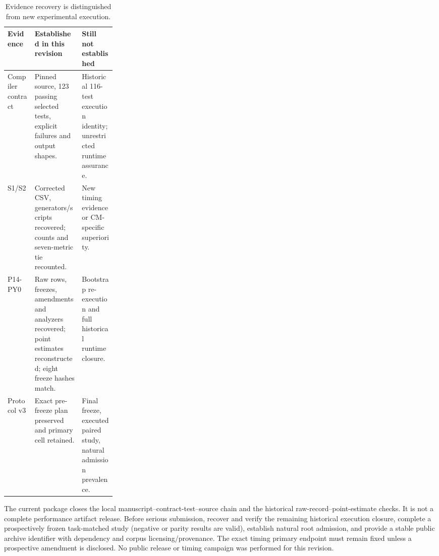 \documentclass[10pt]{article}
\theoremstyle{plain}
\theoremstyle{definition}
\theoremstyle{remark}
\begin{document}
\begin{table}[H]
\small\centering
\begin{tabularx}{\linewidth}{@{}p{0.25\linewidth}XX@{}}
\toprule
\textbf{Evidence} & \textbf{Established in this revision} & \textbf{Still not established}\\
\midrule
Compiler contract & Pinned source, 123 passing selected tests, explicit failures and output shapes. & Historical 116-test execution identity; unrestricted runtime assurance.\\
S1/S2 & Corrected CSV, generators/scripts recovered; counts and seven-metric tie recounted. & New timing evidence or CM-specific superiority.\\
P14-PY0 & Raw rows, freezes, amendments and analyzers recovered; point estimates reconstructed; eight freeze hashes match. & Bootstrap re-execution and full historical runtime closure.\\
Protocol v3 & Exact pre-freeze plan preserved and primary cell retained. & Final freeze, executed paired study, natural admission prevalence.\\
\bottomrule
\end{tabularx}
\caption{Evidence recovery is distinguished from new experimental execution.}
\end{table}

The current package closes the local manuscript--contract-test--source chain and the historical raw-record--point-estimate checks. It is not a complete performance artifact release. Before serious submission, recover and verify the remaining historical execution closure, complete a prospectively frozen task-matched study (negative or parity results are valid), establish natural root admission, and provide a stable public archive identifier with dependency and corpus licensing/provenance. The exact timing primary endpoint must remain fixed unless a prospective amendment is disclosed. No public release or timing campaign was performed for this revision.
\end{document}
